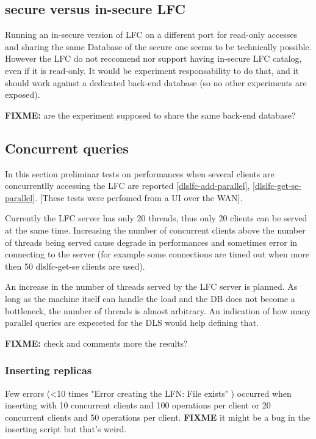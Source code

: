\documentclass[pdftex]{cmspaper}
\begin{document}
\subsection{secure versus in-secure LFC}

Running an in-secure version of LFC on a different port for read-only accesses
and sharing the same Database of the secure one seems to be technically possible.
However the LFC do not reccomend nor support having in-secure LFC catalog,
even if it is read-only. It would be experiment responsability to do that, and it 
should work against a dedicated back-end database (so no other experiments are exposed).

{\bf FIXME: } are the experiment supposed to share the same back-end database?


\subsection{ Concurrent queries }
 
In this section preliminar tests on performances when several clients 
are concurrentlly accessing the LFC are reported
\ref{dlslfc-add-parallel}, \ref{dlslfc-get-se-parallel}.
[These tests were perfomed from a UI over the WAN].

Currently the LFC server has only 20 threads, thus only
20 clients can be served at the same time. 
Increasing the number of concurrent clients above the
number of threads being served cause degrade
in performances and sometimes error in connecting to
the server (for example some connections are timed out
when more then 50 dlslfc-get-se clients are used).


An increase in the number of threads served by the LFC server
is planned. As long as the machine itself can handle the load and 
the DB does not become a bottleneck, the number of threads is 
almost arbitrary. An indication of how many parallel queries 
are expeceted for the DLS would help defining that.


{\bf FIXME:} check and comments more the results?  

\subsubsection{ Inserting replicas}

Few errors (<10 times "Error creating the LFN: File exists" ) 
occurred when inserting with 10 concurrent clients and 100 
operations per client or 20 concurrent clients and 
50 operations per client.
{\bf FIXME} it might be a bug in the inserting script but
that's weird.
\end{document}
